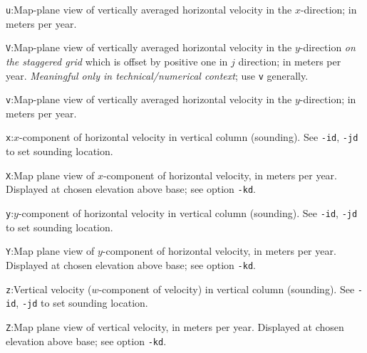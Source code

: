 \documentclass[11pt,final]{amsart}
\begin{document}
\verb|u|:\quad Map-plane view of vertically averaged horizontal velocity in the $x$-direction;  in meters per year.

\verb|V|:\quad Map-plane view of vertically averaged horizontal velocity in the $y$-direction \emph{on the staggered grid} which is offset by positive one in $j$ direction;  in meters per year.  \emph{Meaningful only in technical/numerical context}; use \verb|v| generally.

\verb|v|:\quad Map-plane view of vertically averaged horizontal velocity in the $y$-direction;  in meters per year.

\verb|x|:\quad $x$-component of horizontal velocity in vertical column (sounding).  See \verb|-id|, \verb|-jd| to set sounding location.

\verb|X|:\quad Map plane view of $x$-component of horizontal velocity, in meters per year.  Displayed at chosen elevation above base; see option \verb|-kd|.

\verb|y|:\quad $y$-component of horizontal velocity in vertical column (sounding).  See \verb|-id|, \verb|-jd| to set sounding location.

\verb|Y|:\quad Map plane view of $y$-component of horizontal velocity, in meters per year.  Displayed at chosen elevation above base; see option \verb|-kd|.

\verb|z|:\quad Vertical velocity ($w$-component of velocity) in vertical column (sounding).  See \verb|-id|, \verb|-jd| to set sounding location.

\verb|Z|:\quad Map plane view of vertical velocity, in meters per year.  Displayed at chosen elevation above base; see option \verb|-kd|.


\end{document}
